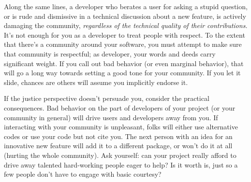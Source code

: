 \documentclass[9pt,training]{livecoms}
\begin{document}
Along the same lines, a developer who berates a user for asking a stupid
question, or is rude and dismissive in a technical discussion about a new
feature, is actively damaging the community, \emph{regardless of the technical
quality of their contributions.} It's not enough for you as a developer to treat
people with respect.  To the extent that there's a community around your
software, you must attempt to make sure that community is respectful; as
developer, your words and deeds carry significant weight. If you call out bad
behavior (or even marginal behavior), that will go a long way towards setting a
good tone for your community. If you let it slide, chances are others will
assume you implicitly endorse it.

If the justice perspective doesn't persuade you, consider the practical
consequences. Bad behavior on the part of developers of your project (or your
community in general) will drive users and developers away from you. If
interacting with your community is unpleasant, folks will either use alternative
codes or use your code but not cite you. The next person with an idea for an
innovative new feature will add it to a different package, or won't do it at
all (hurting the whole community). Ask yourself: can your project really afford to drive away talented hard-working people eager to help? Is it worth is, just so a few people don't have to engage with basic courtesy?
\end{document}
